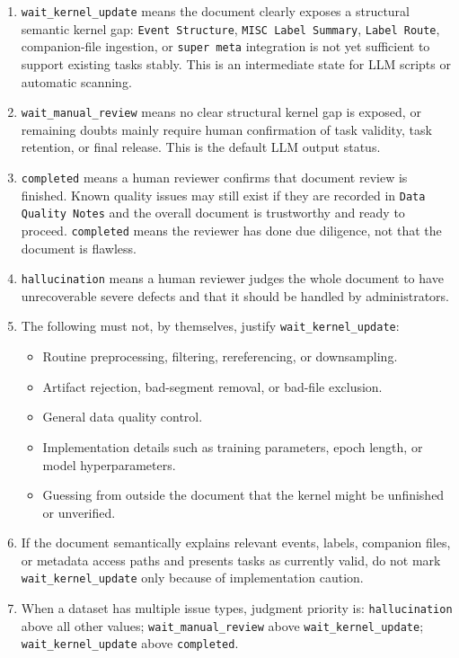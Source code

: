 \begin{tcolorbox}
\begin{enumerate}[leftmargin=1.5em,noitemsep,topsep=2pt]
\item \texttt{wait\_kernel\_update} means the document clearly exposes a structural semantic kernel gap: \texttt{Event Structure}, \texttt{MISC Label Summary}, \texttt{Label Route}, companion-file ingestion, or \texttt{super meta} integration is not yet sufficient to support existing tasks stably. This is an intermediate state for LLM scripts or automatic scanning.
\item \texttt{wait\_manual\_review} means no clear structural kernel gap is exposed, or remaining doubts mainly require human confirmation of task validity, task retention, or final release. This is the default LLM output status.
\item \texttt{completed} means a human reviewer confirms that document review is finished. Known quality issues may still exist if they are recorded in \texttt{Data Quality Notes} and the overall document is trustworthy and ready to proceed. \texttt{completed} means the reviewer has done due diligence, not that the document is flawless.
\item \texttt{hallucination} means a human reviewer judges the whole document to have unrecoverable severe defects and that it should be handled by administrators.
\item The following must not, by themselves, justify \texttt{wait\_kernel\_update}:
\begin{itemize}[leftmargin=1.2em,noitemsep,topsep=1pt]
\item Routine preprocessing, filtering, rereferencing, or downsampling.
\item Artifact rejection, bad-segment removal, or bad-file exclusion.
\item General data quality control.
\item Implementation details such as training parameters, epoch length, or model hyperparameters.
\item Guessing from outside the document that the kernel might be unfinished or unverified.
\end{itemize}
\item If the document semantically explains relevant events, labels, companion files, or metadata access paths and presents tasks as currently valid, do not mark \texttt{wait\_kernel\_update} only because of implementation caution.
\item When a dataset has multiple issue types, judgment priority is: \texttt{hallucination} above all other values; \texttt{wait\_manual\_review} above \texttt{wait\_kernel\_update}; \texttt{wait\_kernel\_update} above \texttt{completed}.
\end{enumerate}


\end{tcolorbox}
